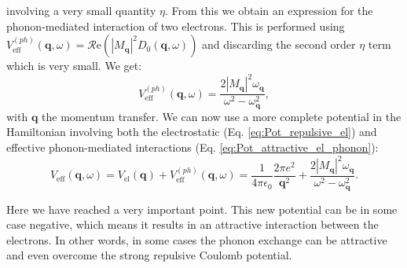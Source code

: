 \documentclass[../main.tex]{subfile}
\begin{document}
involving a very small quantity $\eta$. From this we obtain an expression for the phonon-mediated interaction of two electrons.
This is performed using $V^{(ph)}_{\text{eff}}(\bm{q},\omega) = \mathcal{R}\text{e}\left({|M_{\bm{q}}|^2 D_0(\bm{q},\omega)}\right)$ and discarding the second 
order $\eta$ term which is very small. We get:
\begin{equation}\label{eq:Pot_attractive_el_phonon}
    V^{(ph)}_{\text{eff}}(\bm{q},\omega) = \frac{2|M_{\bm{q}}|^2\omega_{\bm{q}}}{\omega^2 - \omega_{\bm{q}}^2},
\end{equation}
with $\bm{q}$ the momentum transfer. 
We can now use a more complete potential in the Hamiltonian involving both the electrostatic (Eq. \ref{eq:Pot_repulsive_el}) and effective
phonon-mediated interactions (Eq. \ref{eq:Pot_attractive_el_phonon}):
\begin{equation}\label{eq:V_eff_phonon}
    V_{\text{eff}}(\bm{q}, \omega) =  V_{\text{el}}(\bm{q}) + V^{(ph)}_{\text{eff}}(\bm{q},\omega)
     = \frac{1}{4\pi\epsilon_0} \frac{2\pi e^2}{\bm{q}^2} + \frac{2|M_{\bm{q}}|^2\omega_{\bm{q}}}{\omega^2 - \omega_{\bm{q}}^2}.
\end{equation}

Here we have reached a very important point. This new potential can be in some case negative, which means it results in an attractive interaction between the electrons. 
In other words, in some cases the phonon exchange can be attractive and even overcome the strong repulsive Coulomb potential.
\end{document}
